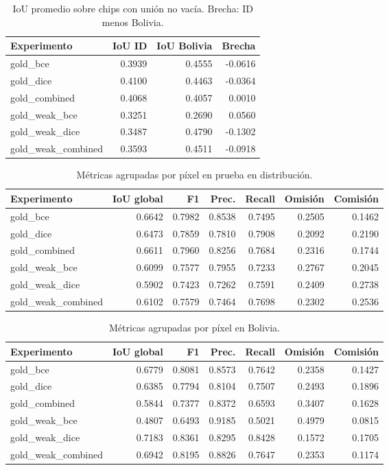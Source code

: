 \begin{table}[H]\centering\small
\caption{IoU promedio sobre chips con unión no vacía. Brecha: ID menos Bolivia.}
\begin{tabular}{lrrr}
\toprule
Experimento & IoU ID & IoU Bolivia & Brecha \\
\midrule
gold\_bce & 0.3939 & 0.4555 & -0.0616 \\
gold\_dice & 0.4100 & 0.4463 & -0.0364 \\
gold\_combined & 0.4068 & 0.4057 & 0.0010 \\
gold\_weak\_bce & 0.3251 & 0.2690 & 0.0560 \\
gold\_weak\_dice & 0.3487 & 0.4790 & -0.1302 \\
gold\_weak\_combined & 0.3593 & 0.4511 & -0.0918 \\
\bottomrule
\end{tabular}
\end{table}
\begin{table}[H]\centering\small
\caption{Métricas agrupadas por píxel en prueba en distribución.}
\begin{tabular}{lrrrrrr}
\toprule
Experimento & IoU global & F1 & Prec. & Recall & Omisión & Comisión \\
\midrule
gold\_bce & 0.6642 & 0.7982 & 0.8538 & 0.7495 & 0.2505 & 0.1462 \\
gold\_dice & 0.6473 & 0.7859 & 0.7810 & 0.7908 & 0.2092 & 0.2190 \\
gold\_combined & 0.6611 & 0.7960 & 0.8256 & 0.7684 & 0.2316 & 0.1744 \\
gold\_weak\_bce & 0.6099 & 0.7577 & 0.7955 & 0.7233 & 0.2767 & 0.2045 \\
gold\_weak\_dice & 0.5902 & 0.7423 & 0.7262 & 0.7591 & 0.2409 & 0.2738 \\
gold\_weak\_combined & 0.6102 & 0.7579 & 0.7464 & 0.7698 & 0.2302 & 0.2536 \\
\bottomrule
\end{tabular}
\end{table}
\begin{table}[H]\centering\small
\caption{Métricas agrupadas por píxel en Bolivia.}
\begin{tabular}{lrrrrrr}
\toprule
Experimento & IoU global & F1 & Prec. & Recall & Omisión & Comisión \\
\midrule
gold\_bce & 0.6779 & 0.8081 & 0.8573 & 0.7642 & 0.2358 & 0.1427 \\
gold\_dice & 0.6385 & 0.7794 & 0.8104 & 0.7507 & 0.2493 & 0.1896 \\
gold\_combined & 0.5844 & 0.7377 & 0.8372 & 0.6593 & 0.3407 & 0.1628 \\
gold\_weak\_bce & 0.4807 & 0.6493 & 0.9185 & 0.5021 & 0.4979 & 0.0815 \\
gold\_weak\_dice & 0.7183 & 0.8361 & 0.8295 & 0.8428 & 0.1572 & 0.1705 \\
gold\_weak\_combined & 0.6942 & 0.8195 & 0.8826 & 0.7647 & 0.2353 & 0.1174 \\
\bottomrule
\end{tabular}
\end{table}
